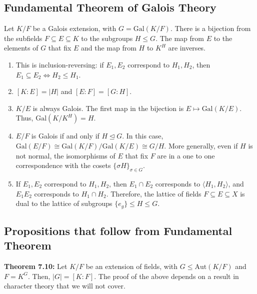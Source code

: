 \documentclass[10pt]{extarticle}
\begin{document}
  \subsection{Fundamental Theorem of Galois Theory}%
  Let $K/F$ be a Galois extension, with $G = \text{Gal}(K/F)$. There is a bijection from the subfields $F\subseteq E\subseteq K$ to the subgroups $H\leq G$. The map from $E$ to the elements of $G$ that fix $E$ and the map from $H$ to $K^{H}$ are inverses.
  \begin{center}
  \end{center}
  \begin{enumerate}[(1)]
    \item This is inclusion-reversing: if $E_1,E_2$ correspond to $H_1,H_2$, then $E_1\subseteq E_2 \Leftrightarrow H_2\leq H_1$.
    \item $[K:E] = |H|$ and $[E:F] = [G:H]$.
    \item $K/E$ is always Galois. The first map in the bijection is $E\mapsto \text{Gal}(K/E)$. Thus, $\text{Gal}(K/K^{H}) = H$.
    \item $E/F$ is Galois if and only if $H\trianglelefteq G$. In this case, $\text{Gal}(E/F) \cong \text{Gal}(K/F)/\text{Gal}(K/E) \cong G/H$. More generally, even if $H$ is not normal, the isomorphisms of $E$ that fix $F$ are in a one to one correspondence with the cosets $\{\sigma H\}_{\sigma\in G}$.
    \item If $E_1,E_2$ correspond to $H_1,H_2$, then $E_1\cap E_2$ corresponds to $\langle H_1,H_2\rangle$, and $E_1E_2$ corresponds to $H_1\cap H_2$. Therefore, the lattice of fields $F\subseteq E\subseteq X$ is dual to the lattice of subgroups $\{e_g\}\leq H\leq G$.
  \end{enumerate}
  \subsection{Propositions that follow from Fundamental Theorem}%
  \textbf{Theorem 7.10:} Let $K/F$ be an extension of fields, with $G\leq \text{Aut}(K/F)$ and $F = K^{G}$. Then, $|G| = [K:F]$. The proof of the above depends on a result in character theory that we will not cover.\\
  
\end{document}

